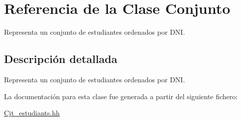 \hypertarget{class_conjunto}{}\section{Referencia de la Clase Conjunto}
\label{class_conjunto}


Representa un conjunto de estudiantes ordenados por D\+NI.  




\subsection{Descripción detallada}
Representa un conjunto de estudiantes ordenados por D\+NI. 

La documentación para esta clase fue generada a partir del siguiente fichero\+:\begin{DoxyCompactItemize}
\item 
\hyperlink{_cjt__estudiants_8hh}{Cjt\+\_\+estudiants.\+hh}\end{DoxyCompactItemize}
